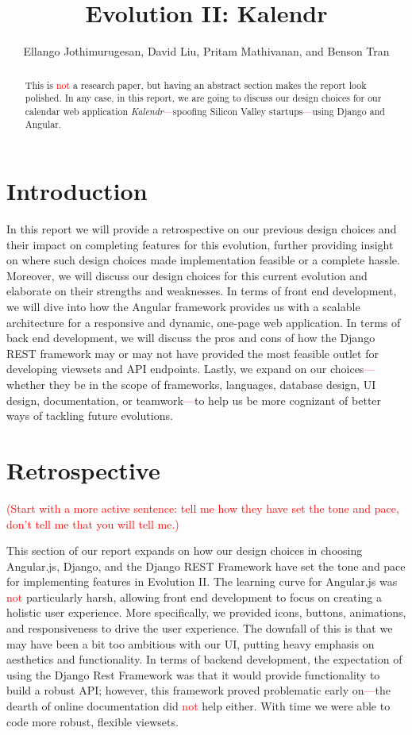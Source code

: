 \documentclass[a4paper]{article}
\title{Evolution II: Kalendr}
\author{Ellango Jothimurugesan, David Liu, Pritam Mathivanan, and Benson Tran}
\newcommand{\comment}[1]{\textcolor{red}{#1}}
\begin{document}
\maketitle

\begin{abstract}
This is \comment{not} a research paper, but having an abstract section makes the report look polished. In any case, in this report, we are going to discuss our design choices for our calendar web application \textit{Kalendr}\comment{---}spoofing Silicon Valley startups\comment{---}using Django and Angular.
\end{abstract}

\section{Introduction}

In this report we will provide a retrospective on our previous design choices and their impact on completing features for this evolution, further providing insight on where such design choices made implementation feasible or a complete hassle. Moreover, we will discuss our design choices for this current evolution and elaborate on their strengths and weaknesses. In terms of front end development, we will dive into how the Angular framework provides us with a scalable architecture for a responsive and dynamic, one-page web application. In terms of back end development, we will discuss the pros and cons of how the Django REST framework may or may not have provided the most feasible outlet for developing viewsets and API endpoints. Lastly, we expand on our choices\comment{---}whether they be in the scope of frameworks, languages, database design, UI design, documentation, or teamwork\comment{---}to help us be more cognizant of better ways of tackling future evolutions.

\section{Retrospective}
\comment{(Start with a more active sentence: tell me how they have set the tone and pace, don't
  tell me that you will tell me.)}

This section of our report expands on how our design choices in choosing Angular.js, Django, and the Django REST Framework have set the tone and pace for implementing features in Evolution II. The learning curve for Angular.js was \comment{not} particularly harsh, allowing front end development to focus on creating a holistic user experience. More specifically, we provided icons, buttons, animations, and responsiveness to drive the user experience. The downfall of this is that we may have been a bit too ambitious with our UI, putting heavy emphasis on aesthetics and functionality. In terms of backend development, the expectation of using the Django Rest Framework was that it would provide functionality to build a robust API; however, this framework proved problematic early on\comment{---}the dearth of online documentation did \comment{not} help either. With time we were able to code more robust, flexible viewsets.
\end{document}
